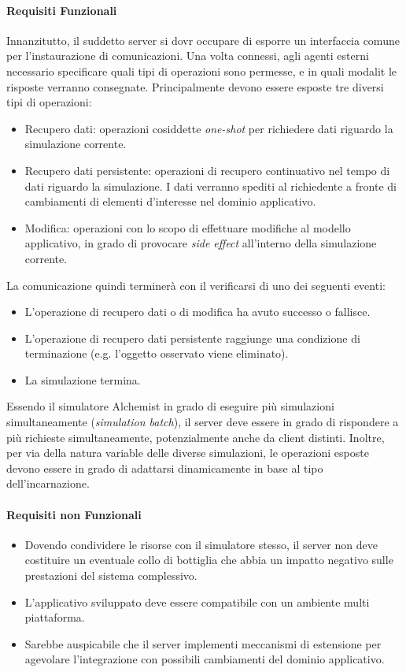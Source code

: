 \paragraph{Requisiti Funzionali} Innanzitutto, il suddetto server si dovr occupare di esporre un interfaccia comune per l'instaurazione
di comunicazioni. Una volta connessi, agli agenti esterni  necessario specificare quali tipi di operazioni sono permesse, e in quali
modalit le risposte verranno consegnate. Principalmente devono essere esposte tre diversi tipi di operazioni:
\begin{itemize}
    \item Recupero dati: operazioni cosiddette \textit{one-shot} per richiedere dati riguardo la simulazione corrente.
    \item Recupero dati persistente: operazioni di recupero continuativo nel tempo di dati riguardo la simulazione. I dati verranno spediti
        al richiedente a fronte di cambiamenti di elementi d'interesse nel dominio applicativo.
    \item Modifica: operazioni con lo scopo di effettuare modifiche al modello applicativo, in grado di provocare \textit{side effect} all'interno
        della simulazione corrente.
\end{itemize}
%
La comunicazione quindi terminerà con il verificarsi di uno dei seguenti eventi:
\begin{itemize}
    \item L'operazione di recupero dati o di modifica ha avuto successo o fallisce.
    \item L'operazione di recupero dati persistente raggiunge una condizione di terminazione (e.g. l'oggetto osservato viene eliminato).
    \item La simulazione termina.
\end{itemize}
%
Essendo il simulatore Alchemist in grado di eseguire più simulazioni simultaneamente (\textit{simulation batch}), il server deve essere in grado
di rispondere a più richieste simultaneamente, potenzialmente anche da client distinti. Inoltre, per via della natura variable delle diverse
simulazioni, le operazioni esposte devono essere in grado di adattarsi dinamicamente in base al tipo dell'incarnazione.

\paragraph{Requisiti non Funzionali}
\begin{itemize}
    \item Dovendo condividere le risorse con il simulatore stesso, il server non deve costituire un eventuale collo di bottiglia che abbia
        un impatto negativo sulle prestazioni del sistema complessivo.
    \item L'applicativo sviluppato deve essere compatibile con un ambiente multi piattaforma.
    \item Sarebbe auspicabile che il server implementi meccanismi di estensione per agevolare l'integrazione con possibili cambiamenti del dominio applicativo.
\end{itemize}

